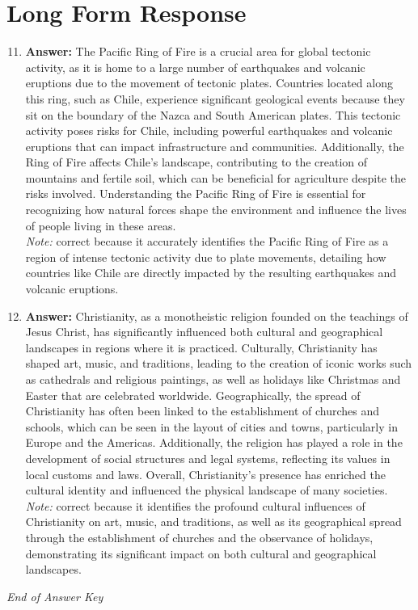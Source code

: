 \documentclass[12pt]{article}
\begin{document}
\section*{Long Form Response}
\begin{enumerate}[label=\arabic*.]
\setcounter{enumi}{10}
\item \textbf{Answer:} The Pacific Ring of Fire is a crucial area for global tectonic activity, as it is home to a large number of earthquakes and volcanic eruptions due to the movement of tectonic plates. Countries located along this ring, such as Chile, experience significant geological events because they sit on the boundary of the Nazca and South American plates. This tectonic activity poses risks for Chile, including powerful earthquakes and volcanic eruptions that can impact infrastructure and communities. Additionally, the Ring of Fire affects Chile's landscape, contributing to the creation of mountains and fertile soil, which can be beneficial for agriculture despite the risks involved. Understanding the Pacific Ring of Fire is essential for recognizing how natural forces shape the environment and influence the lives of people living in these areas.
\\ \textit{Note:} correct because it accurately identifies the Pacific Ring of Fire as a region of intense tectonic activity due to plate movements, detailing how countries like Chile are directly impacted by the resulting earthquakes and volcanic eruptions.
\item \textbf{Answer:} Christianity, as a monotheistic religion founded on the teachings of Jesus Christ, has significantly influenced both cultural and geographical landscapes in regions where it is practiced. Culturally, Christianity has shaped art, music, and traditions, leading to the creation of iconic works such as cathedrals and religious paintings, as well as holidays like Christmas and Easter that are celebrated worldwide. Geographically, the spread of Christianity has often been linked to the establishment of churches and schools, which can be seen in the layout of cities and towns, particularly in Europe and the Americas. Additionally, the religion has played a role in the development of social structures and legal systems, reflecting its values in local customs and laws. Overall, Christianity's presence has enriched the cultural identity and influenced the physical landscape of many societies.
\\ \textit{Note:} correct because it identifies the profound cultural influences of Christianity on art, music, and traditions, as well as its geographical spread through the establishment of churches and the observance of holidays, demonstrating its significant impact on both cultural and geographical landscapes.
\end{enumerate}

\vfill
\noindent\textit{End of Answer Key}
\end{document}
